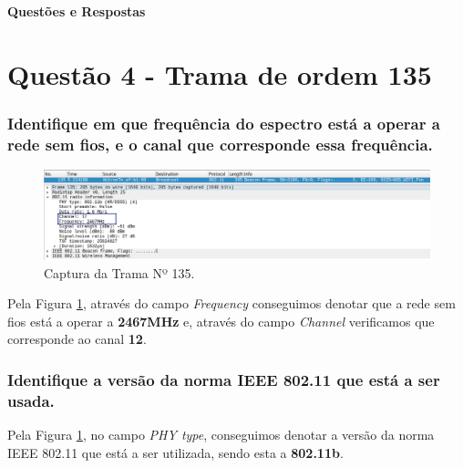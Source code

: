 

{\Large \centering \textbf{Questões e Respostas}\par}


\vspace{20pt}
\section{Questão 4 - Trama de ordem 135}



\subsubsection{Identifique em que frequência do espectro está a operar a rede sem fios, e o canal que corresponde essa frequência.}

    \begin{figure}[H]
    \centering
    \includegraphics[width=\linewidth]{Prints/Questao4/questao4-1.png}
    \caption{Captura da Trama Nº 135.} \label{questao4-1}
    \end{figure}


    \par Pela Figura \ref{questao4-1}, através do campo \textit{Frequency} conseguimos denotar que a rede sem fios está a operar a \textbf{2467MHz} e, através do campo \textit{Channel} verificamos que corresponde ao canal \textbf{12}.




\vspace{15pt}
\subsubsection{Identifique a versão da norma IEEE 802.11 que está a ser usada.}



    \par Pela Figura \ref{questao4-1}, no campo \textit{PHY type}, conseguimos denotar a versão da norma IEEE 802.11 que está a ser utilizada, sendo esta a \textbf{802.11b}.




